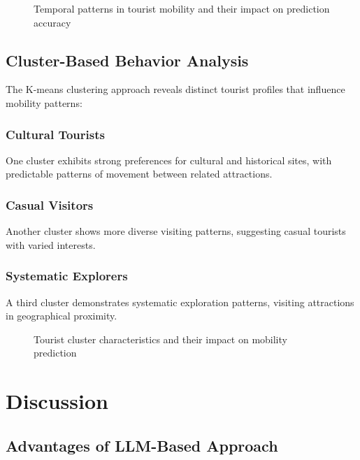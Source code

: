 \documentclass[12pt,a4paper]{article}
\begin{document}
\begin{figure}[H]
\centering
\caption{Temporal patterns in tourist mobility and their impact on prediction accuracy}
\label{fig:temporal_analysis}
\end{figure}

\subsection{Cluster-Based Behavior Analysis}

The K-means clustering approach reveals distinct tourist profiles that influence mobility patterns:

\subsubsection{Cultural Tourists}
One cluster exhibits strong preferences for cultural and historical sites, with predictable patterns of movement between related attractions.

\subsubsection{Casual Visitors}
Another cluster shows more diverse visiting patterns, suggesting casual tourists with varied interests.

\subsubsection{Systematic Explorers}
A third cluster demonstrates systematic exploration patterns, visiting attractions in geographical proximity.

\begin{figure}[H]
\centering
\caption{Tourist cluster characteristics and their impact on mobility prediction}
\label{fig:cluster_analysis}
\end{figure}

\section{Discussion}

\subsection{Advantages of LLM-Based Approach}
\end{document}
